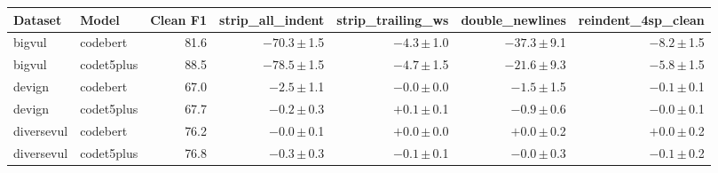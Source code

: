 \begin{tabular}{llrrrrr}
\toprule
Dataset & Model & Clean F1 & strip\_all\_indent & strip\_trailing\_ws & double\_newlines & reindent\_4sp\_clean \\
\midrule
bigvul & codebert & 81.6 & $-70.3$\,$\pm$\,1.5 & $-4.3$\,$\pm$\,1.0 & $-37.3$\,$\pm$\,9.1 & $-8.2$\,$\pm$\,1.5 \\
bigvul & codet5plus & 88.5 & $-78.5$\,$\pm$\,1.5 & $-4.7$\,$\pm$\,1.5 & $-21.6$\,$\pm$\,9.3 & $-5.8$\,$\pm$\,1.5 \\
devign & codebert & 67.0 & $-2.5$\,$\pm$\,1.1 & $-0.0$\,$\pm$\,0.0 & $-1.5$\,$\pm$\,1.5 & $-0.1$\,$\pm$\,0.1 \\
devign & codet5plus & 67.7 & $-0.2$\,$\pm$\,0.3 & $+0.1$\,$\pm$\,0.1 & $-0.9$\,$\pm$\,0.6 & $-0.0$\,$\pm$\,0.1 \\
diversevul & codebert & 76.2 & $-0.0$\,$\pm$\,0.1 & $+0.0$\,$\pm$\,0.0 & $+0.0$\,$\pm$\,0.2 & $+0.0$\,$\pm$\,0.2 \\
diversevul & codet5plus & 76.8 & $-0.3$\,$\pm$\,0.3 & $-0.1$\,$\pm$\,0.1 & $-0.0$\,$\pm$\,0.3 & $-0.1$\,$\pm$\,0.2 \\
\bottomrule
\end{tabular}
